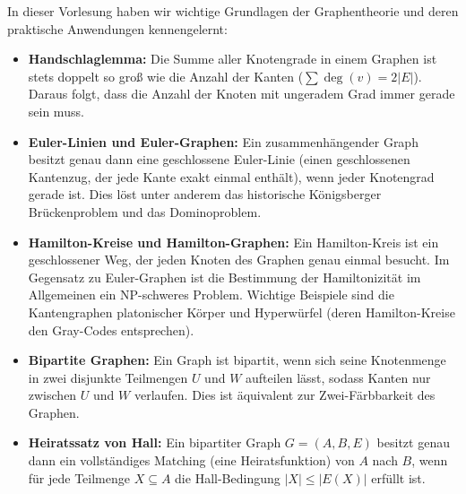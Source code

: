 \begin{nice-box}
In dieser Vorlesung haben wir wichtige Grundlagen der Graphentheorie und deren praktische Anwendungen kennengelernt:
\begin{itemize}
    \item \textbf{Handschlaglemma:} Die Summe aller Knotengrade in einem Graphen ist stets doppelt so groß wie die Anzahl der Kanten ($\sum \deg(v) = 2|E|$). Daraus folgt, dass die Anzahl der Knoten mit ungeradem Grad immer gerade sein muss.
    \item \textbf{Euler-Linien und Euler-Graphen:} Ein zusammenhängender Graph besitzt genau dann eine geschlossene Euler-Linie (einen geschlossenen Kantenzug, der jede Kante exakt einmal enthält), wenn jeder Knotengrad gerade ist. Dies löst unter anderem das historische Königsberger Brückenproblem und das Dominoproblem.
    \item \textbf{Hamilton-Kreise und Hamilton-Graphen:} Ein Hamilton-Kreis ist ein geschlossener Weg, der jeden Knoten des Graphen genau einmal besucht. Im Gegensatz zu Euler-Graphen ist die Bestimmung der Hamiltonizität im Allgemeinen ein NP-schweres Problem. Wichtige Beispiele sind die Kantengraphen platonischer Körper und Hyperwürfel (deren Hamilton-Kreise den Gray-Codes entsprechen).
    \item \textbf{Bipartite Graphen:} Ein Graph ist bipartit, wenn sich seine Knotenmenge in zwei disjunkte Teilmengen $U$ und $W$ aufteilen lässt, sodass Kanten nur zwischen $U$ und $W$ verlaufen. Dies ist äquivalent zur Zwei-Färbbarkeit des Graphen.
    \item \textbf{Heiratssatz von Hall:} Ein bipartiter Graph $G = (A, B, E)$ besitzt genau dann ein vollständiges Matching (eine Heiratsfunktion) von $A$ nach $B$, wenn für jede Teilmenge $X \subseteq A$ die Hall-Bedingung $|X| \le |E(X)|$ erfüllt ist.
\end{itemize}
\end{nice-box}